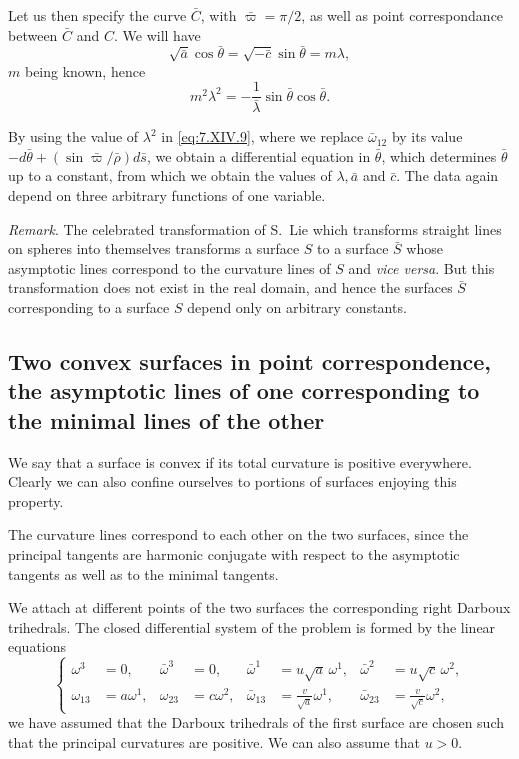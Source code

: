\documentclass[leqno,11pt]{book}
\numberwithin{equation}{chapter}
\theoremstyle{shape1}
\theoremstyle{shape0}
\theoremstyle{shape2}
\theoremstyle{definition}
\begin{document}
Let us then specify the curve $\bar C$, with $\bar\varpi=\pi/2$, as well as point correspondance between $\bar C$ and $C$. We will have
\[
\sqrt{\bar a}\cos\bar\theta=\sqrt{-\bar c}\sin\bar\theta=m\lambda,
\]
$m$ being known, hence
\[
m^{2}\lambda^{2}=-\frac{1}{\bar\lambda}\sin\bar\theta\cos\bar\theta.
\]

By using the value of $\lambda^{2}$ in \eqref{eq:7.XIV.9}, where we replace $\bar\omega_{12}$ by its value $-d\bar\theta+(\sin\bar\varpi/\bar\rho)d\bar s$, we obtain a differential equation in $\bar\theta$, which determines $\bar\theta$ up to a constant, from which we obtain the values of $\lambda,\bar a$ and $\bar c$. The data again depend on three arbitrary functions of one variable.

\emph{Remark}. The celebrated transformation of S.~Lie which transforms straight lines on spheres into themselves transforms a surface $S$ to a surface $\bar S$ whose asymptotic lines correspond to the curvature lines of $S$ and \emph{vice versa}. But this transformation does not exist in the real domain, and hence the surfaces $\bar S$ corresponding to a surface $S$ depend only on arbitrary constants.


\subsection{Two convex surfaces in point correspondence, the asymptotic lines of one corresponding to the minimal lines of the other}
\label{sec:some-convex-surfaces}

\fsec We say that a surface is convex if its total curvature is positive everywhere. Clearly we can also confine ourselves to portions of surfaces enjoying this property.

The curvature lines correspond to each other on the two surfaces, since the principal tangents are harmonic conjugate with respect to the asymptotic tangents as well as to the minimal tangents.

We attach at different points of the two surfaces the corresponding right Darboux trihedrals. The closed differential system of the problem is formed by the linear equations
\begin{equation}
  \label{eq:7.XV.1}\tag{XV, 1}
  \left\{
    \begin{aligned}
      \omega^{3}&=0,&\bar\omega^{3}&=0,&\bar\omega^{1}&=u\sqrt{a}\,\omega^{1},&\bar\omega^{2}&=u\sqrt{c}\,\omega^{2},\\
      \omega_{13}&=a\omega^{1},&\omega_{23}&=c\omega^{2},&\bar\omega_{13}&=\frac{v}{\sqrt{a}}\omega^{1},&\bar\omega_{23}&=\frac{v}{\sqrt{c}}\omega^{2},
    \end{aligned}
  \right.
\end{equation}
we have assumed that the Darboux trihedrals of the first surface are chosen such that the principal curvatures are positive. We can also assume that $u>0$.
\end{document}
